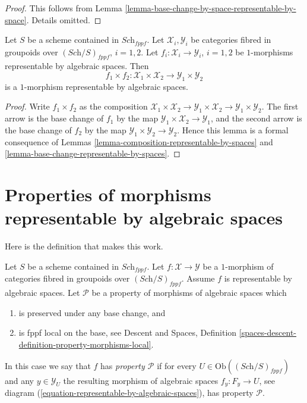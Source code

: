 \begin{proof}
This follows from
Lemma \ref{lemma-base-change-by-space-representable-by-space}.
Details omitted.
\end{proof}

\begin{lemma}
\label{lemma-product-representable-by-spaces}
Let $S$ be a scheme contained in $\textit{Sch}_{fppf}$.
Let $\mathcal{X}_i, \mathcal{Y}_i$ be categories fibred in groupoids over
$(\textit{Sch}/S)_{fppf}$, $i = 1, 2$.
Let $f_i : \mathcal{X}_i \to \mathcal{Y}_i$, $i = 1, 2$
be $1$-morphisms representable by algebraic spaces.
Then
$$
f_1 \times f_2 :
\mathcal{X}_1 \times \mathcal{X}_2
\longrightarrow
\mathcal{Y}_1 \times \mathcal{Y}_2
$$
is a $1$-morphism representable by algebraic spaces.
\end{lemma}

\begin{proof}
Write $f_1 \times f_2$ as the composition
$\mathcal{X}_1 \times \mathcal{X}_2 \to
\mathcal{Y}_1 \times \mathcal{X}_2 \to
\mathcal{Y}_1 \times \mathcal{Y}_2$.
The first arrow is the base change of $f_1$ by the map
$\mathcal{Y}_1 \times \mathcal{X}_2 \to \mathcal{Y}_1$, and the second arrow
is the base change of $f_2$ by the map
$\mathcal{Y}_1 \times \mathcal{Y}_2 \to \mathcal{Y}_2$.
Hence this lemma is a formal
consequence of Lemmas \ref{lemma-composition-representable-by-spaces}
and \ref{lemma-base-change-representable-by-spaces}.
\end{proof}









\section{Properties of morphisms representable by algebraic spaces}
\label{section-representable-properties}

\noindent
Here is the definition that makes this work.

\begin{definition}
\label{definition-relative-representable-property}
Let $S$ be a scheme contained in $\textit{Sch}_{fppf}$.
Let $f : \mathcal{X} \to \mathcal{Y}$ be a $1$-morphism
of categories fibred in groupoids over $(\textit{Sch}/S)_{fppf}$.
Assume $f$ is representable by algebraic spaces.
Let $\mathcal{P}$ be a property of morphisms of algebraic spaces which
\begin{enumerate}
\item is preserved under any base change, and
\item is fppf local on the base, see
Descent and Spaces,
Definition \ref{spaces-descent-definition-property-morphisms-local}.
\end{enumerate}
In this case we say that $f$ has {\it property $\mathcal{P}$} if for every
$U \in \text{Ob}((\textit{Sch}/S)_{fppf})$ and
any $y \in \mathcal{Y}_U$ the resulting morphism of algebraic spaces
$f_y : F_y \to U$, see
diagram (\ref{equation-representable-by-algebraic-spaces}),
has property $\mathcal{P}$.
\end{definition}

